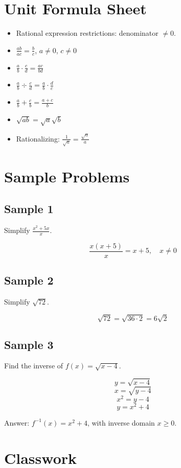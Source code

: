 \documentclass[11pt]{book}
\begin{document}
\section{Unit Formula Sheet}

\begin{itemize}
\item Rational expression restrictions: denominator \(\ne0\).
\item \(\frac{ab}{ac}=\frac bc\), \(a\ne0\), \(c\ne0\)
\item \(\frac ab\cdot\frac cd=\frac{ac}{bd}\)
\item \(\frac ab\div\frac cd=\frac ab\cdot\frac dc\)
\item \(\frac ab+\frac cb=\frac{a+c}{b}\)
\item \(\sqrt{ab}=\sqrt a\sqrt b\)
\item Rationalizing: \(\frac1{\sqrt a}=\frac{\sqrt a}{a}\)
\end{itemize}

\section{Sample Problems}

\subsection{Sample 1}

Simplify \(\frac{x^2+5x}{x}\).

\[\frac{x(x+5)}{x}=x+5,\quad x\ne0\]

\subsection{Sample 2}

Simplify \(\sqrt{72}\).

\[\sqrt{72}=\sqrt{36\cdot2}=6\sqrt2\]

\subsection{Sample 3}

Find the inverse of \(f(x)=\sqrt{x-4}\).

\[y=\sqrt{x-4}\]
\[x=\sqrt{y-4}\]
\[x^2=y-4\]
\[y=x^2+4\]

Answer: \(f^{-1}(x)=x^2+4\), with inverse domain \(x\ge0\).

\section{Classwork}
\end{document}
